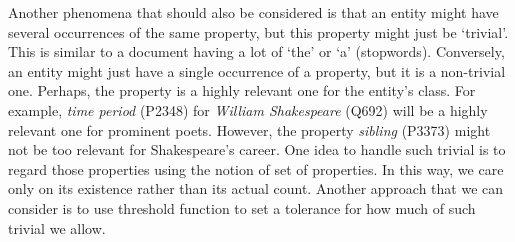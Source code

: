 

Another phenomena that should also be considered is that an entity might have several occurrences of the same property, but this property might just be `trivial'. This is similar to a document having a lot of `the' or `a' (stopwords). Conversely, an entity might just have a single occurrence of a property, but it is a non-trivial one. Perhaps, the property is a highly relevant one for the entity's class. For example, \textit{time period} (P2348) for \textit{William Shakespeare} (Q692) will be a highly relevant one for prominent poets. However, the property \textit{sibling} (P3373) might not be too relevant for Shakespeare's career. One idea to handle such trivial is to regard those properties using the notion of set of properties. In this way, we care only on its existence rather than its actual count. Another approach that we can consider is to use threshold function to set a tolerance for how much of such trivial we allow.





